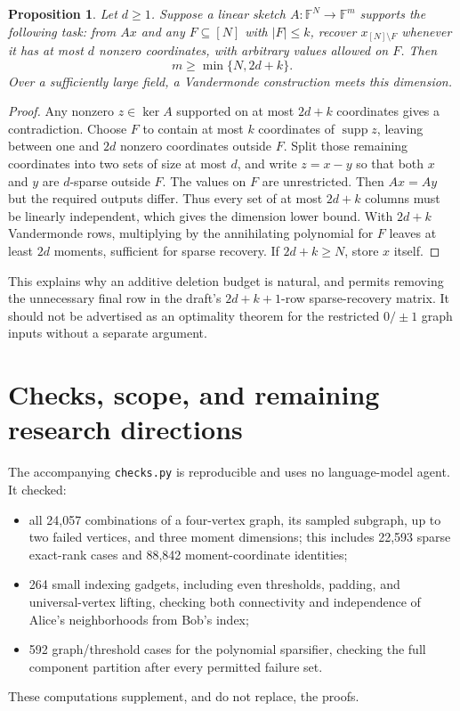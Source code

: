 \documentclass[11pt]{article}
\newtheorem{proposition}[theorem]{Proposition}
\theoremstyle{remark}\newtheorem{remark}[theorem]{Remark}
\newcommand{\F}{\mathbb F}
\newcommand{\supp}{\operatorname{supp}}
\begin{document}
\begin{proposition}
Let $d\ge1$. Suppose a linear sketch $A:\F^N\to\F^m$ supports the following task: from $Ax$ and any $F\subseteq[N]$ with $|F|\le k$, recover $x_{[N]\setminus F}$ whenever it has at most $d$ nonzero coordinates, with arbitrary values allowed on $F$. Then
\[
 m\ge\min\{N,2d+k\}.
\]
Over a sufficiently large field, a Vandermonde construction meets this dimension.
\end{proposition}
\begin{proof}
Any nonzero $z\in\ker A$ supported on at most $2d+k$ coordinates gives a contradiction. Choose $F$ to contain at most $k$ coordinates of $\supp z$, leaving between one and $2d$ nonzero coordinates outside $F$. Split those remaining coordinates into two sets of size at most $d$, and write $z=x-y$ so that both $x$ and $y$ are $d$-sparse outside $F$. The values on $F$ are unrestricted. Then $Ax=Ay$ but the required outputs differ. Thus every set of at most $2d+k$ columns must be linearly independent, which gives the dimension lower bound. With $2d+k$ Vandermonde rows, multiplying by the annihilating polynomial for $F$ leaves at least $2d$ moments, sufficient for sparse recovery. If $2d+k\ge N$, store $x$ itself.
\end{proof}

This explains why an additive deletion budget is natural, and permits removing the unnecessary final row in the draft's $2d+k+1$-row sparse-recovery matrix. It should not be advertised as an optimality theorem for the restricted $0/\pm1$ graph inputs without a separate argument.

\section{Checks, scope, and remaining research directions}
The accompanying \texttt{checks.py} is reproducible and uses no language-model agent. It checked:
\begin{itemize}[nosep]
\item all 24,057 combinations of a four-vertex graph, its sampled subgraph, up to two failed vertices, and three moment dimensions; this includes 22,593 sparse exact-rank cases and 88,842 moment-coordinate identities;
\item 264 small indexing gadgets, including even thresholds, padding, and universal-vertex lifting, checking both connectivity and independence of Alice's neighborhoods from Bob's index;
\item 592 graph/threshold cases for the polynomial sparsifier, checking the full component partition after every permitted failure set.
\end{itemize}
These computations supplement, and do not replace, the proofs.
\end{document}
